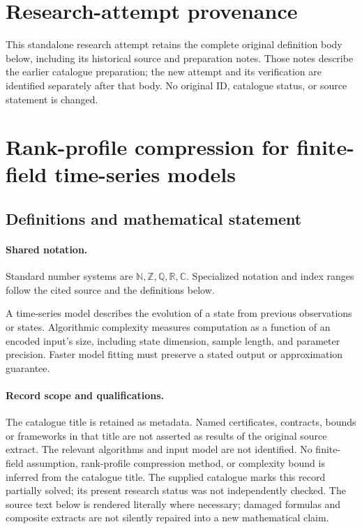 \documentclass[11pt]{article}
\begin{document}
\section*{Research-attempt provenance}
This standalone research attempt retains the complete original definition body below,
including its historical source and preparation notes. Those notes describe the
earlier catalogue preparation; the new attempt and its verification are identified
separately after that body. No original ID, catalogue status, or source statement is changed.

\section{Rank-profile compression for finite-field time-series models}\label{statement}

\subsection{Definitions and mathematical statement}

\paragraph{Shared notation.}Standard number systems are $\mathbb N,\mathbb Z,\mathbb Q,\mathbb R,\mathbb C$. Specialized notation and index ranges follow the cited source and the definitions below.


A time-series model describes the evolution of a state from previous observations or states. Algorithmic complexity measures computation as a function of an encoded input's size, including state dimension, sample length, and parameter precision. Faster model fitting must preserve a stated output or approximation guarantee.
\paragraph{Record scope and qualifications.}
The catalogue title is retained as metadata. Named certificates, contracts, bounds or frameworks in that title are not asserted as results of the original source extract.
The relevant algorithms and input model are not identified. No finite-field assumption, rank-profile compression method, or complexity bound is inferred from the catalogue title. The supplied catalogue marks this record partially solved; its present research status was not independently checked.
The source text below is rendered literally where necessary; damaged formulas and composite extracts are not silently repaired into a new mathematical claim.
\end{document}
